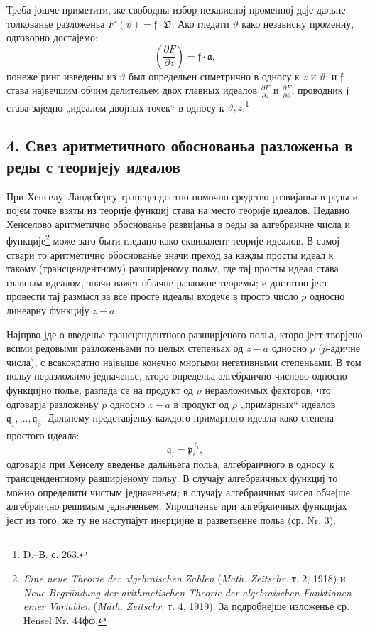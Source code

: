 ﻿\documentclass[11pt]{article}
\providecommand{\p}{\partial}
\providecommand{\frD}{\mathfrak D}
\providecommand{\frf}{\mathfrak f}
\providecommand{\fra}{\mathfrak a}
\providecommand{\frp}{\mathfrak p}
\begin{document}
Треба јошче приметити, же свободны избор независној променној даје дальне толкованье разложеньа \(F'(\vartheta)=\frf\cdot\frD\). Ако гледати \(\vartheta\) како независну променну, одговорно достајемо:
\[
\left(\frac{\p F}{\p z}\right)=\frf\cdot\fra,
\]
понеже ринг изведены из \(\vartheta\) был определьен симетрично в односу к \(z\) и \(\vartheta\); и \(\frf\) става највечшим обчим делительем двох главных идеалов \(\frac{\p F}{\p z}\) и \(\frac{\p F}{\p\vartheta}\); проводник \(\frf\) става заједно „идеалом двојных точек“ в односу к \(\vartheta,z\).\footnote{D.--В. с. 263.}

\subsection*{4. Свез аритметичного обоснованьа разложеньа в реды с теоријеју идеалов}
При Хенселу--Ландсбергу трансцендентно помочно средство развијаньа в реды и појем точке взяты из теорије функциј става на место теорије идеалов. Недавно Хенселово аритметично обоснованье развијаньа в реды за алгебраичне числа и функције\footnote{\emph{Eine neue Theorie der algebraischen Zahlen} (\emph{Math. Zeitschr.} т. 2, 1918) и \emph{Neue Begründung der arithmetischen Theorie der algebraischen Funktionen einer Variablen} (\emph{Math. Zeitschr.} т. 4, 1919). За подробнејше изложенье ср. Hensel Nr. 44фф.} може зато быти гледано како еквивалент теорије идеалов. В самој ствари то аритметично обоснованье значи преход за кажды просты идеал к такому (трансцендентному) разширјеному польу, где тај просты идеал става главным идеалом, значи важет обычне разложне теоремы; и достатно јест провести тај размысл за все просте идеалы входече в просто число \(p\) односно линеарну функцију \(z-a\).

Најпрво јде о введенье трансцендентного разширјеного польа, кторо јест творјено всими редовыми разложеньами по целых степеньах од \(z-a\) односно \(p\) (\(p\)-адичне числа), с всакократно највыше конечно многыми негативными степеньами. В том польу неразложимо једначенье, кторо определьа алгебраично числово односно функцијно полье, разпада се на продукт од \(\rho\) неразложимых факторов, что одговарја разложеньу \(p\) односно \(z-a\) в продукт од \(\rho\) „примарных“ идеалов \(\mathfrak q_1,\ldots,\mathfrak q_\rho\). Дальнему представјеньу каждого примарного идеала како степена простого идеала:
\[
\mathfrak q_i=\frp_i^{\,\ell_i},
\]
одговарја при Хенселу введенье дальньега польа, алгебраичного в односу к трансцендентному разширјеному польу. В случају алгебраичных функциј то можно определити чистым једначеньем; в случају алгебраичных чисел обчејше алгебраично решимым једначеньем. Упрошченье при алгебраичных функцијах јест из того, же ту не наступајут инерцијне и разветвенне польа (ср. Nr. 3).
\end{document}
